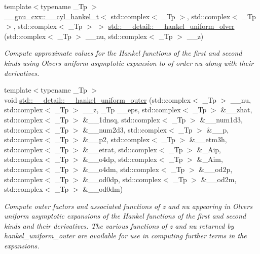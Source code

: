 \begin{DoxyCompactItemize}
{\footnotesize template$<$typename \+\_\+\+Tp $>$ }\\\hyperlink{struct____gnu__cxx_1_1____cyl__hankel__t}{\+\_\+\+\_\+gnu\+\_\+cxx\+::\+\_\+\+\_\+cyl\+\_\+hankel\+\_\+t}$<$ std\+::complex$<$ \+\_\+\+Tp $>$, std\+::complex$<$ \+\_\+\+Tp $>$, std\+::complex$<$ \+\_\+\+Tp $>$ $>$ \hyperlink{namespacestd_1_1____detail_abbd697ee381eb2e489caa077ba7b00d9}{std\+::\+\_\+\+\_\+detail\+::\+\_\+\+\_\+hankel\+\_\+uniform\+\_\+olver} (std\+::complex$<$ \+\_\+\+Tp $>$ \+\_\+\+\_\+nu, std\+::complex$<$ \+\_\+\+Tp $>$ \+\_\+\+\_\+z)
\begin{DoxyCompactList}\small\item\em Compute approximate values for the Hankel functions of the first and second kinds using Olver\textquotesingle{}s uniform asymptotic expansion to of order {\ttfamily nu} along with their derivatives. \end{DoxyCompactList}\item 
{\footnotesize template$<$typename \+\_\+\+Tp $>$ }\\void \hyperlink{namespacestd_1_1____detail_a099751f2a153283d91f19d6efa52117a}{std\+::\+\_\+\+\_\+detail\+::\+\_\+\+\_\+hankel\+\_\+uniform\+\_\+outer} (std\+::complex$<$ \+\_\+\+Tp $>$ \+\_\+\+\_\+nu, std\+::complex$<$ \+\_\+\+Tp $>$ \+\_\+\+\_\+z, \+\_\+\+Tp \+\_\+\+\_\+eps, std\+::complex$<$ \+\_\+\+Tp $>$ \&\+\_\+\+\_\+zhat, std\+::complex$<$ \+\_\+\+Tp $>$ \&\+\_\+\+\_\+1dnsq, std\+::complex$<$ \+\_\+\+Tp $>$ \&\+\_\+\+\_\+num1d3, std\+::complex$<$ \+\_\+\+Tp $>$ \&\+\_\+\+\_\+num2d3, std\+::complex$<$ \+\_\+\+Tp $>$ \&\+\_\+\+\_\+p, std\+::complex$<$ \+\_\+\+Tp $>$ \&\+\_\+\+\_\+p2, std\+::complex$<$ \+\_\+\+Tp $>$ \&\+\_\+\+\_\+etm3h, std\+::complex$<$ \+\_\+\+Tp $>$ \&\+\_\+\+\_\+etrat, std\+::complex$<$ \+\_\+\+Tp $>$ \&\+\_\+\+Aip, std\+::complex$<$ \+\_\+\+Tp $>$ \&\+\_\+\+\_\+o4dp, std\+::complex$<$ \+\_\+\+Tp $>$ \&\+\_\+\+Aim, std\+::complex$<$ \+\_\+\+Tp $>$ \&\+\_\+\+\_\+o4dm, std\+::complex$<$ \+\_\+\+Tp $>$ \&\+\_\+\+\_\+od2p, std\+::complex$<$ \+\_\+\+Tp $>$ \&\+\_\+\+\_\+od0dp, std\+::complex$<$ \+\_\+\+Tp $>$ \&\+\_\+\+\_\+od2m, std\+::complex$<$ \+\_\+\+Tp $>$ \&\+\_\+\+\_\+od0dm)
\begin{DoxyCompactList}\small\item\em Compute outer factors and associated functions of {\ttfamily z} and {\ttfamily nu} appearing in Olver\textquotesingle{}s uniform asymptotic expansions of the Hankel functions of the first and second kinds and their derivatives. The various functions of z and nu returned by {\ttfamily hankel\+\_\+uniform\+\_\+outer} are available for use in computing further terms in the expansions. \end{DoxyCompactList}\item 

\end{DoxyCompactItemize}
